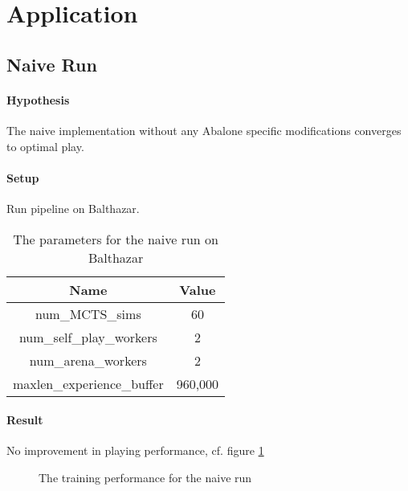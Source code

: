 \section{Application}
\subsection{Naive Run}
\paragraph{Hypothesis} The naive implementation without any Abalone specific modifications converges to optimal play.
\paragraph{Setup} Run pipeline on Balthazar.

\begin{table}[!h]
    \begin{center}
        \begin{tabular}{ c|c }
            Name                       & Value   \\
            \hline
            \hline
            num\_MCTS\_sims            & 60      \\
            num\_self\_play\_workers   & 2       \\
            num\_arena\_workers        & 2       \\
            maxlen\_experience\_buffer & 960,000 \\
        \end{tabular}
    \end{center}
    \caption{The parameters for the naive run on Balthazar}
\end{table}

\paragraph{Result} No improvement in playing performance, cf. figure \ref{performance_local_naive}
\begin{figure}[!h]
    \centering
    \hfill
    \caption{The training performance for the naive run}
    \label{performance_local_naive}
\end{figure}

